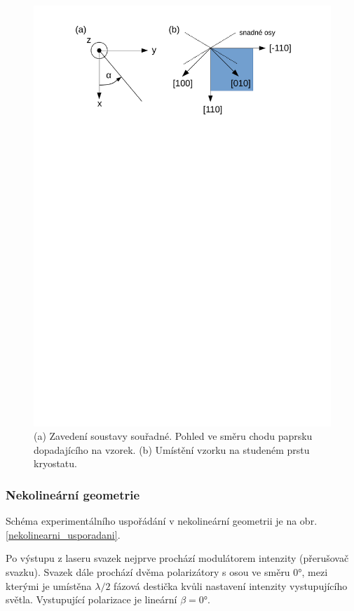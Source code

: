 \begin{figure}[htbp]\centering
	\includegraphics[trim={1in 8.5in 1in 0.5in}, clip, width=\textwidth]{./png/soustava}
	\caption{(a) Zavedení soustavy souřadné. Pohled ve směru chodu paprsku dopadajícího na vzorek. (b) Umístění vzorku na studeném prstu kryostatu.}\label{souradna_soustava_vzorek}
\end{figure}


\subsubsection*{Nekolineární geometrie}

Schéma experimentálního uspořádání v nekolineární geometrii je na obr. \ref{nekolinearni_usporadani}.

Po výstupu z laseru svazek nejprve prochází modulátorem intenzity (přerušovač svazku).
Svazek dále prochází dvěma polarizátory s osou ve směru \ang{0}, mezi kterými je umístěna $\lambda/2$ fázová destička kvůli nastavení intenzity vystupujícího světla. Vystupující polarizace je lineární $\beta=\ang{0}$.

